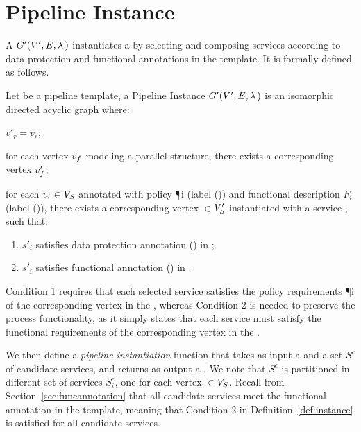 \section{Pipeline Instance}\label{sec:instance}
A \pipelineInstance $G'(V',E,\lambda\,)$ instantiates a \pipelineTemplate \tChartFunction by selecting and composing services according to data protection and functional annotations in the template. It is formally defined as follows.
\vspace{0.5em}
\begin{definition}\label{def:instance}
  Let \tChartFunction be a pipeline template, a Pipeline Instance $G'(V',E,\lambda\,)$ is an isomorphic directed acyclic graph where:
  \begin{enumerate*}[label=\textit{\roman*})]
    \item $v'_r$$=$$v_r$;
    \item for each vertex $v_{f}$ modeling a parallel structure, there exists a corresponding vertex $v'_{f}$;
    \item for each $v_{i}$$\in$$V_S$ annotated with policy \P{i} (label \myLambda()) and functional description $F_i$ (label \myGamma()), there exists a corresponding vertex $\in$$V'_S$ instantiated with a service , such that:
  \end{enumerate*}
  \begin{enumerate}[label=\arabic*)]
    \item $s'_i$ satisfies data protection annotation \myLambda() in \tChartFunction;
    \item $s'_i$ satisfies functional annotation \myGamma() in \tChartFunction.
  \end{enumerate}
\end{definition}

\vspace{0.5em}

Condition 1 requires that each selected service  satisfies the policy requirements \P{i} of the corresponding vertex  in the \pipelineTemplate, whereas Condition 2 is needed to preserve the process functionality, as it simply states that each service  must satisfy the functional requirements  of the corresponding vertex  in the \pipelineTemplate.

We then define a \emph{pipeline instantiation} function that takes as input a \pipelineTemplate \tChartFunction and a set $S^c$ of candidate services, and returns as output a \pipelineInstance \iChartFunction. We note that $S^c$ is partitioned in different set of services $S^c_{i}$, one for each vertex $\in$$V_S$. Recall from Section~\ref{sec:funcannotation} that all candidate services meet the functional annotation in the template, meaning that Condition 2 in Definition~\ref{def:instance} is satisfied for all candidate services.

